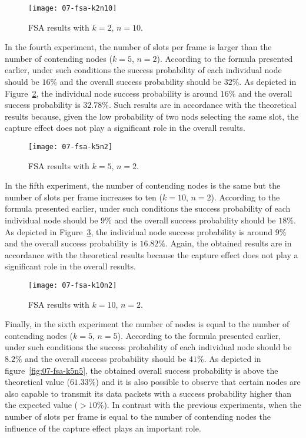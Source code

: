 \begin{figure}[!ht]
    \centering
	\texttt{[image: 07-fsa-k2n10]}
    \caption{FSA results with $k=2$, $n=10$.}
    \label{fig:07-fsa-k2n10}
\end{figure}

In the fourth experiment, the number of slots per frame is larger than the number of contending nodes ($k=5$, $n=2$). According to the formula presented earlier, under such conditions the success probability of each individual node should be $16\%$ and the overall success probability should be $32\%$. As depicted in Figure~\ref{fig:07-fsa-k5n2}, the individual node success probability is around $16\%$ and the overall success probability is $32.78\%$. Such results are in accordance with the theoretical results because, given the low probability of two nods selecting the same slot, the capture effect does not play a significant role in the overall results.

\begin{figure}[!ht]
    \centering
	\texttt{[image: 07-fsa-k5n2]}
    \caption{FSA results with $k=5$, $n=2$.}
    \label{fig:07-fsa-k5n2}
\end{figure}

In the fifth experiment, the number of contending nodes is the same but the number of slots per frame increases to ten ($k=10$, $n=2$). According to the formula presented earlier, under such conditions the success probability of each individual node should be $9\%$ and the overall success probability should be $18\%$. As depicted in Figure~\ref{fig:07-fsa-k10n2}, the individual node success probability is around $9\%$ and the overall success probability is $16.82\%$. Again, the obtained results are in accordance with the theoretical results because the capture effect does not play a significant role in the overall results.

\begin{figure}[!ht]
    \centering
	\texttt{[image: 07-fsa-k10n2]}
    \caption{FSA results with $k=10$, $n=2$.}
    \label{fig:07-fsa-k10n2}
\end{figure}

Finally, in the sixth experiment the number of nodes is equal to the number of contending nodes ($k=5$, $n=5$). According to the formula presented earlier, under such conditions the success probability of each individual node should be $8.2\%$ and the overall success probability should be $41\%$. As depicted in figure~\ref{fig:07-fsa-k5n5}, the obtained overall success probability is above the theoretical value ($61.33\%$) and it is also possible to observe that certain nodes are also capable to transmit its data packets with a success probability higher than the expected value ($>10\%$). In contrast with the previous experiments, when the number of slots per frame is equal to the number of contending nodes the influence of the capture effect plays an important role.

